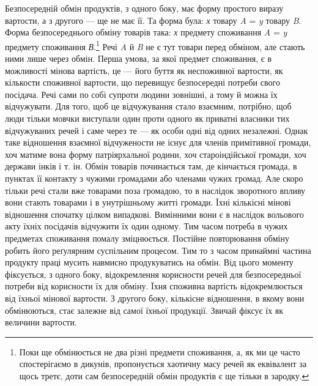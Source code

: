 Безпосередній обмін продуктів, з одного боку, має форму
простого виразу вартости, а з другого — ще не має її. Та форма
була: \emph{х} товару \emph{A} = \emph{y} товару \emph{B}. Форма безпосереднього обміну
товарів така: \emph{х} предмету споживання \emph{A} = \emph{y} предмету споживання
\emph{В}.\footnote{
Поки ще обмінюється не два різні предмети споживання, а, як
ми це часто спостерігаємо в дикунів, пропонується хаотичну масу речей
як еквівалент за щось третє, доти сам безпосередній обмін продуктів є
ще тільки в зародку.
} Речі \emph{A} й \emph{B} не є тут товари перед обміном, але стають ними
лише через обмін. Перша умова, за якої предмет споживання,
є в можливості мінова вартість, це — його буття як неспоживної
вартости, як кількости споживної вартости, що перевищує
безпосередні потреби свого посідача. Речі сами по собі супроти
людини зовнішні, а тому й можна їх відчужувати. Для того,
щоб це відчужування стало взаємним, потрібно, щоб люди тільки
мовчки виступали один проти одного як приватні власники тих
відчужуваних речей і саме через те — як особи одні від одних
незалежні. Однак таке відношення взаємної відчужености не
існує для членів примітивної громади, хоч матиме вона форму
патріярхальної родини, хоч староіндійської громади, хоч держави
інків і т. ін. Обмін товарів починається там, де кінчається
громада, в пунктах її контакту з чужими громадами або членами
чужих громад. Але скоро тільки речі стали вже товарами поза
громадою, то в наслідок зворотного впливу вони стають товарами
і в унутрішньому житті громади. Їхні кількісні мінові відношення
спочатку цілком випадкові. Вимінними вони є в наслідок
вольового акту їхніх посідачів відчужити їх один одному. Тим часом
потреба в чужих предметах споживання помалу зміцнюється.
Постійне повторювання обміну робить його реґулярним
суспільним процесом. Тим то з часом принаймні частина продукту
праці мусить навмисно продукуватись на обмін. Від цього моменту
фіксується, з одного боку, відокремлення корисности речей
для безпосередньої потреби від корисности їх для обміну. Їхня
споживна вартість відокремлюється від їхньої мінової вартости.
З другого боку, кількісне відношення, в якому вони обмінюються,
стає залежне від самої їхньої продукції. Звичай фіксує їх як
величини вартости.

